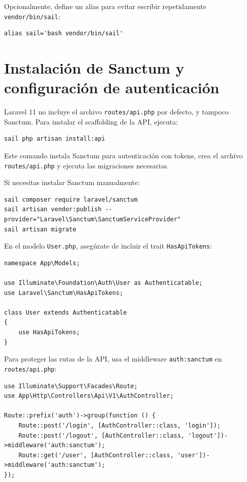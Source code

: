 \documentclass[11pt]{article}
\begin{document}
Opcionalmente, define un alias para evitar escribir repetidamente \texttt{vendor/bin/sail}:

\begin{verbatim}
alias sail='bash vendor/bin/sail'
\end{verbatim}

\section{Instalación de Sanctum y configuración de autenticación}
\label{sec:orga0b6eb1}

Laravel 11 no incluye el archivo \texttt{routes/api.php} por defecto, y tampoco Sanctum. Para instalar el scaffolding de la API, ejecuta:

\begin{verbatim}
sail php artisan install:api
\end{verbatim}

Este comando instala Sanctum para autenticación con tokens, crea el archivo \texttt{routes/api.php} y ejecuta las migraciones necesarias.

Si necesitas instalar Sanctum manualmente:

\begin{verbatim}
sail composer require laravel/sanctum
sail artisan vendor:publish --provider="Laravel\Sanctum\SanctumServiceProvider"
sail artisan migrate
\end{verbatim}

En el modelo \texttt{User.php}, asegúrate de incluir el trait \texttt{HasApiTokens}:

\begin{verbatim}
namespace App\Models;

use Illuminate\Foundation\Auth\User as Authenticatable;
use Laravel\Sanctum\HasApiTokens;

class User extends Authenticatable
{
    use HasApiTokens;
}
\end{verbatim}

Para proteger las rutas de la API, usa el middleware \texttt{auth:sanctum} en \texttt{routes/api.php}:

\begin{verbatim}
use Illuminate\Support\Facades\Route;
use App\Http\Controllers\Api\V1\AuthController;

Route::prefix('auth')->group(function () {
    Route::post('/login', [AuthController::class, 'login']);
    Route::post('/logout', [AuthController::class, 'logout'])->middleware('auth:sanctum');
    Route::get('/user', [AuthController::class, 'user'])->middleware('auth:sanctum');
});
\end{verbatim}
\end{document}
